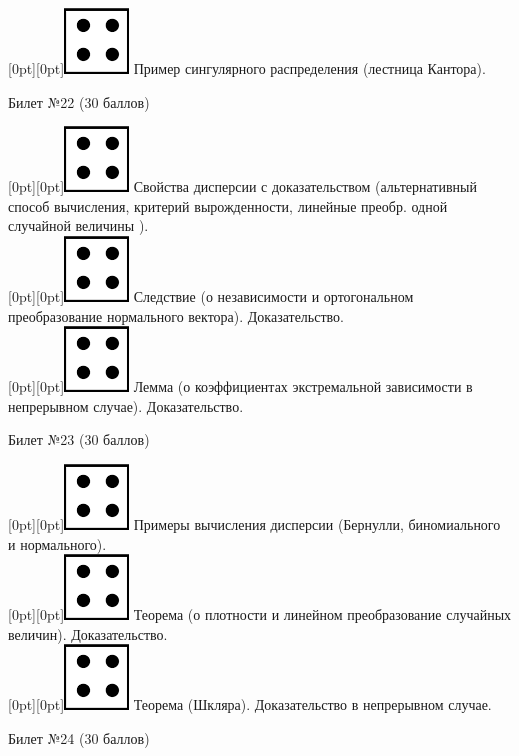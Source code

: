 \documentclass[10pt]{article}
\begin{document}
\raisebox{-1pt}[0pt][0pt]{\includegraphics[width=0.02\linewidth]{4.png}}   Пример сингулярного распределения (лестница Кантора). \\
\begin{center} {\Large Билет №22 (30 баллов)} \end{center}
\raisebox{-1pt}[0pt][0pt]{\includegraphics[width=0.02\linewidth]{4.png}} Свойства дисперсии с доказательством (альтернативный способ вычисления, критерий вырожденности, линейные преобр. одной случайной величины ). \\ 
\raisebox{-1pt}[0pt][0pt]{\includegraphics[width=0.02\linewidth]{4.png}} Следствие (о независимости и  ортогональном преобразование нормального вектора). Доказательство. \\ 
\raisebox{-1pt}[0pt][0pt]{\includegraphics[width=0.02\linewidth]{4.png}} Лемма (о коэффициентах экстремальной зависимости в непрерывном случае). Доказательство. \\
\begin{center} {\Large Билет №23 (30 баллов)} \end{center}
\raisebox{-1pt}[0pt][0pt]{\includegraphics[width=0.02\linewidth]{4.png}} Примеры вычисления дисперсии (Бернулли, биномиального и нормального). \\
\raisebox{-1pt}[0pt][0pt]{\includegraphics[width=0.02\linewidth]{4.png}} Теорема (о плотности и линейном преобразование случайных величин). Доказательство. \\
\raisebox{-1pt}[0pt][0pt]{\includegraphics[width=0.02\linewidth]{4.png}} Теорема (Шкляра). Доказательство в непрерывном случае. \\
\begin{center} {\Large Билет №24 (30 баллов)} \end{center}
\end{document}
